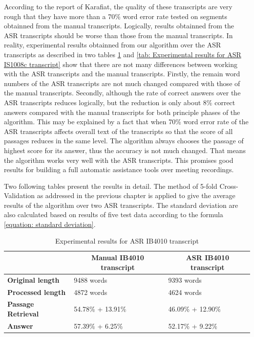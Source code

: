 \documentclass[10pt,a4paper]{article}
\numberwithin{algorithm}{section}  %
\begin{document}
According to the report of Karafiat, the quality  of these transcripts are very rough that they have more than a 70\% word error rate tested on segments obtainned from the manual transcripts. Logically, results obtainned from the ASR transcripts should be worse than those from the manual transcripts. In reality, experimental results obtainned from our algorithm over the ASR transcripts as described in two tables \ref{tab: Experimental results for ASR IB4010 transcript} and \ref{tab: Experimental results for ASR IS1008c transcript} show that there are not many differences between working with the ASR transcripts and the manual transcripts. Firstly, the remain word numbers of the ASR transcripts are not much changed compared with those of the manual transcripts. Secondly, although the rate of correct answers over the ASR transcripts reduces logically, but the reduction is only about 8\% correct answers compared with the manual transcripts for both principle phases of the algorithm. This may be explained by a fact that when 70\% word error rate of the ASR transcripts affects overall text of the transcripts so that the score of all passages reduces in the same level. The algorithm always chooses the passage of highest score for its answer, thus the accuracy is not much changed. That means the algorithm works very well with the ASR transcripts. This promises good results for building a full automatic assistance tools over meeting recordings.

Two following tables present the results in detail. The method of 5-fold Cross-Validation as addressed in the previous chapter is applied to give the average results of the algorithm over two ASR transcripts. The standard deviation are also calculated based on results of five test data according to the formula \ref{equation: standard deviation}.

\begin{table}[htbp]
\scriptsize
\caption{Experimental results for ASR IB4010 transcript}
\begin{tabular}{|l|l|l|}
\hline
\textbf{} & \multicolumn{1}{c|}{\textbf{Manual IB4010 transcript}} & \multicolumn{1}{c|}{\textbf{ASR IB4010 transcript}} \\ \hline
\textbf{Original length} & 9488 words & 9393 words\\ \hline
\textbf{Processed length} & 4872 words & 4624 words \\ \hline
\textbf{Passage Retrieval} & 54.78\% + 13.91\% & 46.09\% + 12.90\% \\ \hline
\textbf{Answer} & 57.39\% + 6.25\% & 52.17\% + 9.22\% \\ \hline
\end{tabular}
\label{tab: Experimental results for ASR IB4010 transcript}
\end{table}
\end{document}
